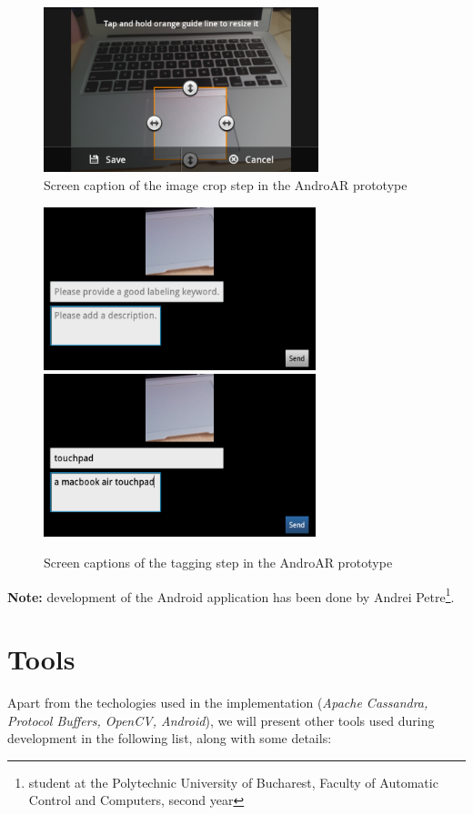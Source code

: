 \documentclass[a4paper,onecolumn,oneside,titlepage,11pt]{report}
\begin{document}
\begin{figure}[H]
\begin{center}
\includegraphics[width=8cm]{images/crop.png}
\caption{Screen caption of the image crop step in the AndroAR prototype}
\end{center}
\end{figure}

\begin{figure}[H]
\begin{center}
\includegraphics[width=7.9cm]{images/metadata.png}
\includegraphics[width=7.9cm]{images/metadata_send.png}
\caption{Screen captions of the tagging step in the AndroAR prototype}
\end{center}
\end{figure}

\textbf{Note:} development of the Android application has been done by Andrei Petre\footnote{student at the Polytechnic University of Bucharest, Faculty of Automatic Control and Computers, second year}.

\section{Tools}
\label{sec:tools}
Apart from the techologies used in the implementation (\emph{Apache Cassandra, Protocol Buffers, OpenCV, Android}), we will present other tools used during development in the following list, along with some details:
\end{document}
